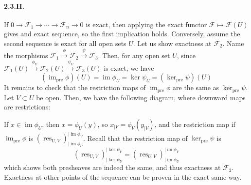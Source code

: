 \documentclass{article}
\newcommand{\pre}{\mathrm{pre}}
\DeclareMathOperator{\im}{im}
\DeclareMathOperator{\res}{res}
\newcommand{\Fsheaf}{\mathscr{F}}
\begin{document}
\paragraph{2.3.H.} If $0 \to \Fsheaf_1 \to \cdots \to \Fsheaf_n \to 0$ is exact, then applying the exact functor $\Fsheaf \mapsto \Fsheaf(U)$ gives and exact sequence, so the first implication holds. Conversely, assume the second sequence is exact for all open sets $U$. Let us show exactness at $\Fsheaf_2$. Name the morphisms $\Fsheaf_1 \xrightarrow{\phi} \Fsheaf_2 \xrightarrow{\psi} \Fsheaf_3$. Then, for any open set $U$, since $\Fsheaf_1(U) \xrightarrow{\phi_U} \Fsheaf_2(U) \xrightarrow{\psi_U} \Fsheaf_3(U)$ is exact, we have
\[(\im_\pre \phi)(U) = \im \phi_U = \ker \psi_U = (\ker_\pre \psi)(U)\]
It remains to check that the restriction maps of $\im_\pre \phi$ are the same as $\ker_\pre \psi$. Let $V \subset U$ be open. Then, we have the following diagram, where downward maps are restrictions:
\begin{center}
\end{center}
If $x \in \im \phi_U$, then $x = \phi_U (y)$, so $x_{\mid V} = \phi_V(y_{\mid V})$, and the restriction map if $\im_\pre \phi$ is $(\res_{U,V})_{\mid \im \phi_U}^{\mid \im \phi_V}$. Recall that the restriction map of $\ker_\pre \psi$ is
\[(\res_{U,V})_{\mid \ker \psi_U}^{\mid \ker \psi_V} = (\res_{U,V})_{\mid \im \phi_U}^{\mid \im \phi_V}\]
which shows both presheaves are indeed the same, and thus exactness at $\Fsheaf_2$. Exactness at other points of the sequence can be proven in the exact same way.
\end{document}
